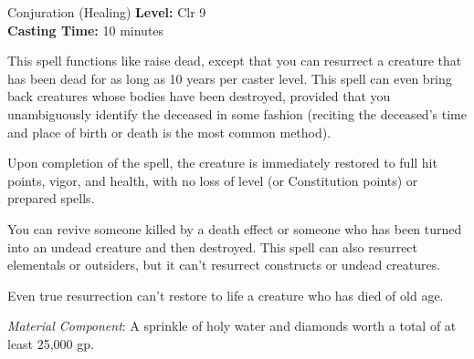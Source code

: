 {Conjuration (Healing)}
{
	\textbf{Level:}
	Clr 9\\
	\textbf{Casting Time:}
	10 minutes\\
}
{
	This spell functions like raise dead, except that you can resurrect a creature that has been dead for as long as 10 years per caster level. This spell can even bring back creatures whose bodies have been destroyed, provided that you unambiguously identify the deceased in some fashion (reciting the deceased's time and place of birth or death is the most common method).

	Upon completion of the spell, the creature is immediately restored to full hit points, vigor, and health, with no loss of level (or Constitution points) or prepared spells.

	You can revive someone killed by a death effect or someone who has been turned into an undead creature and then destroyed. This spell can also resurrect elementals or outsiders, but it can't resurrect constructs or undead creatures.

	Even true resurrection can't restore to life a creature who has died of old age.

	\textit{Material Component}:
	A sprinkle of holy water and diamonds worth a total of at least 25,000 gp.

}
